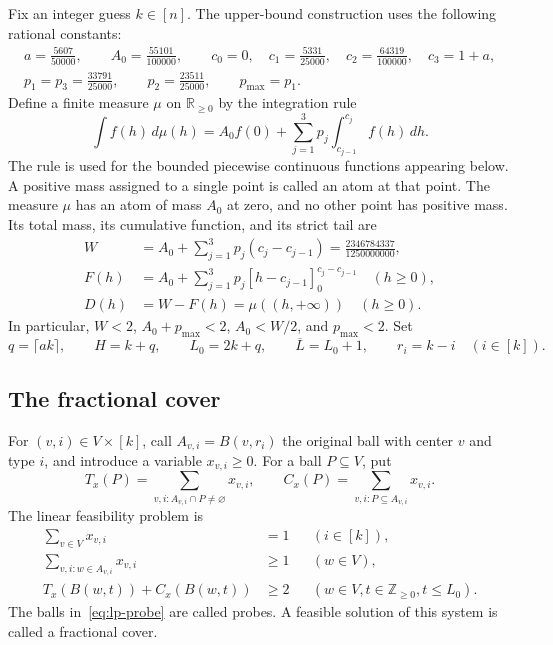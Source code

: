 \documentclass[11pt]{article}
\numberwithin{equation}{section}
\theoremstyle{definition}
\newcommand{\Z}{\mathbb Z}
\newcommand{\R}{\mathbb R}
\newcommand{\cL}{\overline L}
\begin{document}
Fix an integer guess $k\in[n]$. The upper-bound construction uses the
following rational constants:
\begin{equation}\label{eq:profile}
\begin{gathered}
 a=\frac{5607}{50000},\qquad A_0=\frac{55101}{100000},\qquad
 c_0=0,\quad c_1=\frac{5331}{25000},\quad
 c_2=\frac{64319}{100000},\quad c_3=1+a,\\
 p_1=p_3=\frac{33791}{25000},\qquad
 p_2=\frac{23511}{25000},\qquad p_{\max}=p_1.
\end{gathered}
\end{equation}
Define a finite measure $\mu$ on $\R_{\ge0}$ by the integration rule
\begin{equation}\label{eq:measure}
 \int f(h)\,d\mu(h)
 = A_0 f(0)+\sum_{j=1}^3p_j\int_{c_{j-1}}^{c_j}f(h)\,dh.
\end{equation}
The rule is used for the bounded piecewise continuous functions appearing
below. A positive mass assigned to a single point is called an atom at
that point. The measure $\mu$ has an atom of mass $A_0$ at zero, and
no other point has positive mass.
Its total mass, its cumulative function, and its strict tail are
\begin{align}
 W&=A_0+\sum_{j=1}^3p_j(c_j-c_{j-1})
    =\frac{2346784337}{1250000000},\label{eq:mass}\\
 F(h)&=A_0+\sum_{j=1}^3p_j[h-c_{j-1}]_0^{c_j-c_{j-1}}
       \quad(h\ge0),\label{eq:cdf}\\
 D(h)&=W-F(h)=\mu((h,+\infty))\quad(h\ge0).\label{eq:tail}
\end{align}
In particular, $W<2$, $A_0+p_{\max}<2$, $A_0<W/2$, and $p_{\max}<2$.
Set
\begin{equation}\label{eq:horizons}
 q=\lceil ak\rceil,\qquad H=k+q,\qquad L_0=2k+q,\qquad \cL=L_0+1,
 \qquad r_i=k-i\quad(i\in[k]).
\end{equation}

\subsection{The fractional cover}

For $(v,i)\in V\times[k]$, call $A_{v,i}=B(v,r_i)$ the original ball
with center $v$ and type $i$, and introduce a variable $x_{v,i}\ge0$.
For a ball $P\subseteq V$, put
\[
 T_x(P)=\sum_{v,i:A_{v,i}\cap P\ne\varnothing}x_{v,i},\qquad
 C_x(P)=\sum_{v,i:P\subseteq A_{v,i}}x_{v,i}.
\]
The linear feasibility problem is
\begin{align}
 \sum_{v\in V}x_{v,i}&=1 &&(i\in[k]),\label{eq:lp-type}\\
 \sum_{v,i:w\in A_{v,i}}x_{v,i}&\ge1 &&(w\in V),\label{eq:lp-cover}\\
 T_x(B(w,t))+C_x(B(w,t))&\ge2
       &&(w\in V, t\in\Z_{\ge0}, t\le L_0).
       \label{eq:lp-probe}
\end{align}
The balls in~\eqref{eq:lp-probe} are called probes.
A feasible solution of this system is called a fractional cover.
\end{document}
